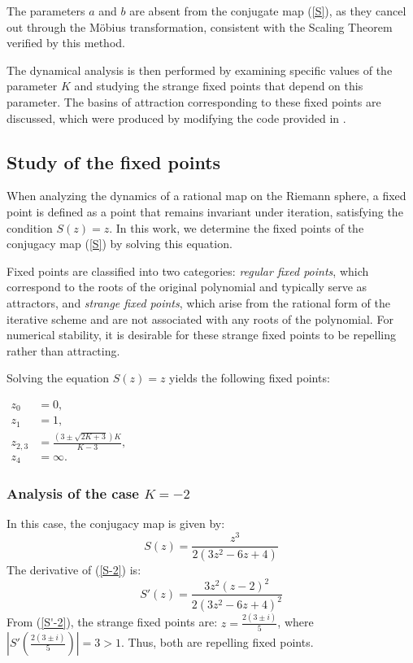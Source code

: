 \documentclass{article}
\theoremstyle{definition}
\theoremstyle{remark}
\begin{document}
The parameters \( a \) and \( b \) are absent from the conjugate map (\ref{S}), as they cancel out through the Möbius transformation, consistent with the Scaling Theorem verified by this method.

The dynamical analysis is then performed by examining specific values of the parameter \( K \) and studying the strange fixed points that depend on this parameter. The basins of attraction corresponding to these fixed points are discussed, which were produced by modifying the code provided in \cite{CECadenas2017d}.



\subsection{Study of the fixed points}
When analyzing the dynamics of a rational map on the Riemann sphere, a fixed point is defined as a point that remains invariant under iteration, satisfying the condition $S(z) = z$. In this work, we determine the fixed points of the conjugacy map (\ref{S}) by solving this equation.

Fixed points are classified into two categories: \emph{regular fixed points}, which correspond to the roots of the original polynomial and typically serve as attractors, and \emph{strange fixed points}, which arise from the rational form of the iterative scheme and are not associated with any roots of the polynomial. For numerical stability, it is desirable for these strange fixed points to be repelling rather than attracting.

Solving the equation $S(z) = z$ yields the following fixed points:

$
\begin{aligned}
	z_{0} &= 0, \\[4pt]
	z_{1} &= 1, \\[4pt]
	z_{2, 3} &= \frac{(3 \pm \sqrt{2K + 3})K}{K - 3}, \\[4pt]
	z_{4} &= \infty.
\end{aligned}
$

\subsubsection{Analysis of the case $K=-2$}
In this case, the conjugacy map is given by:
\begin{equation}\label{S-2}
	S(z)=\frac{z^3}{2(3z^2-6z+4)}
\end{equation}
The derivative of (\ref{S-2}) is:
\begin{equation}\label{S'-2}
	S'(z)=\frac{3z^2(z-2)^2}{2\left(3z^2-6z+4\right)^2}
\end{equation}
From (\ref{S'-2}), the strange fixed points are:
$z=\frac{2(3\pm i)}{5}$, where $\left|S'\left(\frac{2(3\pm i)}{5}\right)\right|=3 > 1$. Thus, both are repelling fixed points.
\end{document}
